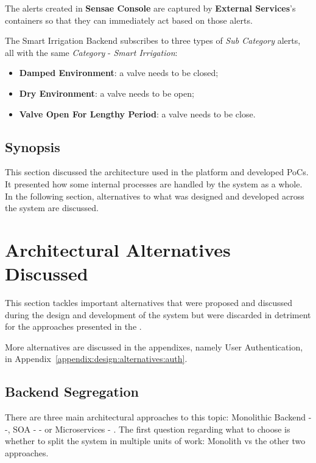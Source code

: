 The alerts created in \textbf{Sensae Console} are captured by \textbf{External Services}'s containers so that they can immediately act based on those alerts.

The Smart Irrigation Backend subscribes to three types of \textit{Sub Category} alerts, all with the same \textit{Category} - \textit{Smart Irrigation}:

\begin{itemize}
   \item \textbf{Damped Environment}: a valve needs to be closed;
   \item \textbf{Dry Environment}: a valve needs to be open;
   \item \textbf{Valve Open For Lengthy Period}: a valve needs to be close.
\end{itemize}

\subsection{Synopsis}
\label{subsubsec:design:architecture:synopsis}

This section discussed the architecture used in the platform and developed \gls{PoC}s. It presented how some internal processes are handled by the system as a whole.
In the following section, alternatives to what was designed and developed across the system are discussed.

\section{Architectural Alternatives Discussed}
\label{sec:design:alternatives}

This section tackles important alternatives that were proposed and discussed during the design and development of the system but were discarded in detriment for the approaches presented in the .

More alternatives are discussed in the appendixes, namely User Authentication, in Appendix~\ref{appendix:design:alternatives:auth}.

\subsection{Backend Segregation}
\label{subsec:design:alternatives:backend}

There are three main architectural approaches to this topic: Monolithic Backend - \cite{micromono} -, \gls{SOA} - \cite{ibmsoa} - or Microservices - \cite{martinmicro}. The first question regarding what to choose is whether to split the system in multiple units of work: Monolith vs the other two approaches.

